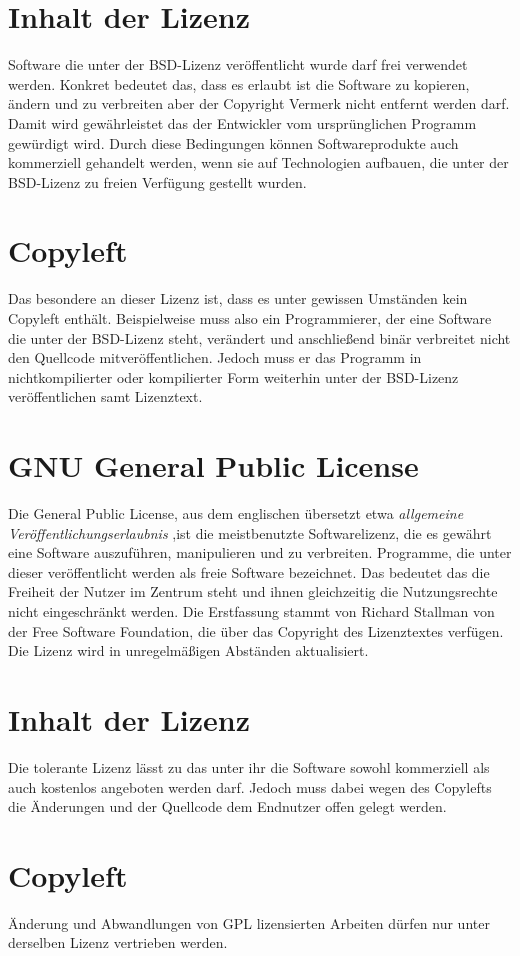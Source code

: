 \section*{Inhalt der Lizenz \cite{BSDLicense}}
Software die unter der BSD-Lizenz veröffentlicht wurde darf frei verwendet werden. Konkret bedeutet das, dass es erlaubt ist die Software zu kopieren, ändern und zu verbreiten aber der Copyright Vermerk nicht entfernt werden darf. Damit wird gewährleistet das der Entwickler vom ursprünglichen Programm gewürdigt wird. Durch diese Bedingungen können Softwareprodukte auch kommerziell gehandelt werden, wenn sie auf Technologien aufbauen, die unter der BSD-Lizenz zu freien Verfügung gestellt wurden.

\section*{Copyleft}
Das besondere an dieser Lizenz ist, dass es unter gewissen Umständen kein Copyleft enthält. Beispielweise muss also ein Programmierer, der eine Software die unter der BSD-Lizenz steht, verändert und anschließend binär verbreitet nicht den Quellcode mitveröffentlichen. Jedoch muss er das Programm in nichtkompilierter oder kompilierter Form weiterhin unter der BSD-Lizenz veröffentlichen samt Lizenztext.

\newpage
\section{GNU General Public License}\label{sec:GNU}
Die General Public License, aus dem englischen übersetzt etwa \textit{allgemeine Veröffentlichungserlaubnis} ,ist die meistbenutzte Softwarelizenz, die es gewährt eine Software auszuführen, manipulieren und zu verbreiten. Programme, die unter dieser veröffentlicht werden als freie Software bezeichnet. Das bedeutet das die Freiheit der Nutzer im Zentrum steht und ihnen gleichzeitig die Nutzungsrechte nicht eingeschränkt werden. Die Erstfassung stammt von Richard Stallman von der Free Software Foundation, die über das Copyright des Lizenztextes verfügen. Die Lizenz wird in unregelmäßigen Abständen aktualisiert.

 \section*{Inhalt der Lizenz \cite{GNULicense}}
Die tolerante Lizenz lässt zu das unter ihr die Software sowohl kommerziell als auch kostenlos angeboten werden darf. Jedoch muss dabei wegen des Copylefts die Änderungen und der Quellcode dem Endnutzer offen gelegt werden. 

\section*{Copyleft}
Änderung und Abwandlungen von GPL lizensierten Arbeiten dürfen nur unter derselben Lizenz vertrieben werden.

